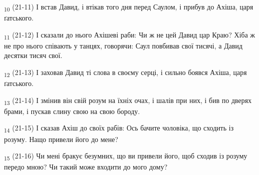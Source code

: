 \begin{tcolorbox}
\textsubscript{10} (21-11) І встав Давид, і втікав того дня перед Саулом, і прибув до Ахіша, царя ґатського.
\end{tcolorbox}
\begin{tcolorbox}
\textsubscript{11} (21-12) І сказали до нього Ахішеві раби: Чи ж не цей Давид цар Краю? Хіба ж не про нього співають у танцях, говорячи: Саул повбивав свої тисячі, а Давид десятки тисяч свої.
\end{tcolorbox}
\begin{tcolorbox}
\textsubscript{12} (21-13) І заховав Давид ті слова в своєму серці, і сильно боявся Ахіша, царя ґатського.
\end{tcolorbox}
\begin{tcolorbox}
\textsubscript{13} (21-14) І змінив він свій розум на їхніх очах, і шалів при них, і бив по дверях брами, і пускав слину свою на свою бороду.
\end{tcolorbox}
\begin{tcolorbox}
\textsubscript{14} (21-15) І сказав Ахіш до своїх рабів: Ось бачите чоловіка, що сходить із розуму. Нащо привели його до мене?
\end{tcolorbox}
\begin{tcolorbox}
\textsubscript{15} (21-16) Чи мені бракує безумних, що ви привели його, щоб сходив із розуму передо мною? Чи такий може входити до мого дому?
\end{tcolorbox}
